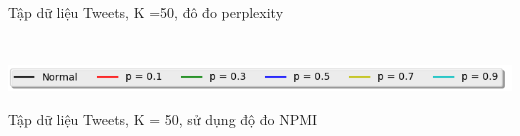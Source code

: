 \documentclass[pdf]{beamer}
\begin{document}
\begin{frame}{Tập dữ liệu Tweets, K =50, đô đo perplexity}
\begin{columns}[T]
\begin{column}{.50\textwidth}
\begin{figure}
\end{figure}				
\end{column} %
\end{columns}
\begin{center}
\includegraphics[width=1\textwidth]{menu.png}	
\end{center}
\end{frame}

\begin{frame}{Tập dữ liệu Tweets, K = 50, sử dụng độ đo NPMI }
\begin{columns}[T] %
\begin{column}{.50\textwidth}
\begin{figure}
\end{figure}
\end{column} %
\hfill%
\begin{column}{.50\textwidth}
\begin{figure}

\end{figure}
\end{column}
\end{columns}
\end{frame}
\end{document}
